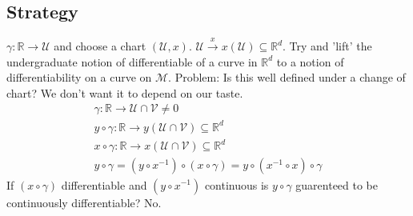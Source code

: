 \documentclass[10pt, oneside]{article}
\newcommand{\R}{\mathbb{R}}
\newcommand{\M}{\mathcal{M}}
\begin{document}
   \subsection*{Strategy}
      $\gamma: \R \to \mathcal{U}$ and choose a chart $(\mathcal{U},x)$. $\mathcal{U} \xrightarrow{x} x(\mathcal{U}) \subseteq \R^d$. 
      Try and 'lift' the undergraduate notion of differentiable of a curve in $\R^d$ to a notion of differentiability on a curve on $\M$.
      Problem: Is this well defined under a change of chart? We don't want it to depend on our taste. 
      \begin{align}
         \gamma: \R \to\mathcal{U} \cap \mathcal{V} \neq 0 \\
         y \circ \gamma: \R \to y(\mathcal{U} \cap \mathcal{V}) \subseteq \R^d \\
         x \circ \gamma: \R \to x(\mathcal{U} \cap \mathcal{V}) \subseteq \R^d \\
         y \circ \gamma = (y \circ x^{-1}) \circ (x \circ \gamma) = y \circ (x^{-1} \circ x) \circ \gamma 
      \end{align}
      If $(x \circ \gamma)$ differentiable and $(y \circ x^{-1})$ continuous is $y \circ \gamma$ guarenteed to be continuously differentiable? No.
\end{document}
